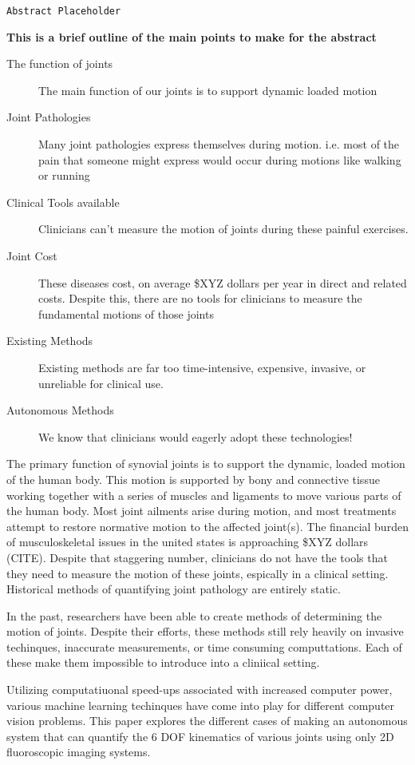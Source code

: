 \texttt{Abstract Placeholder}

{\bf \color{red} This is a brief outline of the main points to make for the abstract}

\begin{description}
    \item[The function of joints] The main function of our joints is to support dynamic loaded motion
    \item[Joint Pathologies] Many joint pathologies express themselves during motion. i.e. most of the pain that someone might express would occur during motions like walking or running
    \item[Clinical Tools available] Clinicians can't measure the motion of joints during these painful exercises. 
    \item[Joint Cost] These diseases cost, on average \$XYZ dollars per year in direct and related costs. Despite this, there are no tools for clinicians to measure the fundamental motions of those joints
    \item[Existing Methods] Existing methods are far too time-intensive, expensive, invasive, or unreliable for clinical use.
    \item[Autonomous Methods] We know that clinicians would eagerly adopt these technologies!  
\end{description}

The primary function of synovial joints is to support the dynamic, loaded motion of the human body. This motion is supported by bony and connective tissue working together with a series of muscles and ligaments to move various parts of the human body. Most joint ailments arise during motion, and most treatments attempt to restore normative motion to the affected joint(s). The financial burden of musculoskeletal issues in the united states is approaching \$XYZ dollars (CITE). Despite that staggering number, clinicians do not have the tools that they need to measure the motion of these joints, espically in a clinical setting. Historical methods of quantifying joint pathology are entirely static. 

In the past, researchers have been able to create methods of determining the motion of joints. Despite their efforts, these methods still rely heavily on invasive techinques, inaccurate measurements, or time consuming computtations. Each of these make them impossible to introduce into a cliniical setting.

Utilizing computatiuonal speed-ups associated with increased computer power, various machine learning techinques have come into play for different computer vision problems. This paper explores the different cases of making an autonomous system that can quantify the 6 DOF kinematics of various joints using only 2D fluoroscopic imaging systems.